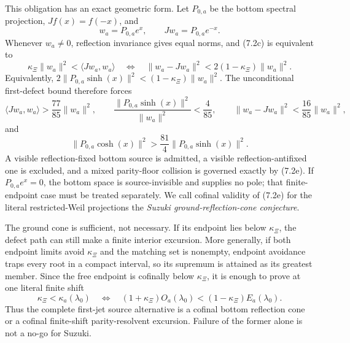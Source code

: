 \documentclass[11pt]{article}
\theoremstyle{definition}
\theoremstyle{remark}
\begin{document}
This obligation has an exact geometric form.  Let $P_{0,a}$ be the bottom spectral projection,
$Jf(x)=f(-x)$, and
\[
 w_a=P_{0,a}e^x,\qquad Jw_a=P_{0,a}e^{-x}.
\]
Whenever $w_a\ne0$, reflection invariance gives equal norms, and (7.2c) is equivalent to
\[
 \kappa_\Xi\|w_a\|^2<\langle Jw_a,w_a\rangle
 \quad\Longleftrightarrow\quad
 \|w_a-Jw_a\|^2
 <2(1-\kappa_\Xi)\|w_a\|^2.
 \tag{7.2e}
\]
Equivalently,
$2\|P_{0,a}\sinh(x)\|^2<(1-\kappa_\Xi)\|w_a\|^2$.  The unconditional first-defect
bound therefore forces
\[
 \langle Jw_a,w_a\rangle>\frac{77}{85}\|w_a\|^2,\qquad
 \frac{\|P_{0,a}\sinh(x)\|^2}{\|w_a\|^2}<\frac4{85},\qquad
 \|w_a-Jw_a\|^2<\frac{16}{85}\|w_a\|^2,
\tag{7.2f}
\]
and
\[
 \|P_{0,a}\cosh(x)\|^2>\frac{81}{4}\|P_{0,a}\sinh(x)\|^2.
\]
A visible reflection-fixed bottom source is admitted, a visible reflection-antifixed one is
excluded, and a mixed parity-floor collision is governed exactly by (7.2e).  If
$P_{0,a}e^x=0$, the bottom space is source-invisible and supplies no pole; that finite-endpoint
case must be treated separately.  We call cofinal validity of (7.2e) for the literal
restricted-Weil projections the \emph{Suzuki ground-reflection-cone conjecture}.

The ground cone is sufficient, not necessary.  If its endpoint lies below $\kappa_\Xi$, the
defect path can still make a finite interior excursion.  More generally, if both endpoint limits
avoid $\kappa_\Xi$ and the matching set is nonempty, endpoint avoidance traps every root in a
compact interval, so its supremum is attained as its greatest member.  Since the free endpoint is
cofinally below $\kappa_\Xi$, it is enough to prove at one literal finite shift
\[
 \kappa_\Xi<\kappa_a(\lambda_0)
 \quad\Longleftrightarrow\quad
 (1+\kappa_\Xi)O_a(\lambda_0)
  <(1-\kappa_\Xi)E_a(\lambda_0).
\]
Thus the complete first-jet source alternative is a cofinal bottom reflection cone or a cofinal
finite-shift parity-resolvent excursion.  Failure of the former alone is not a no-go for Suzuki.
\end{document}
